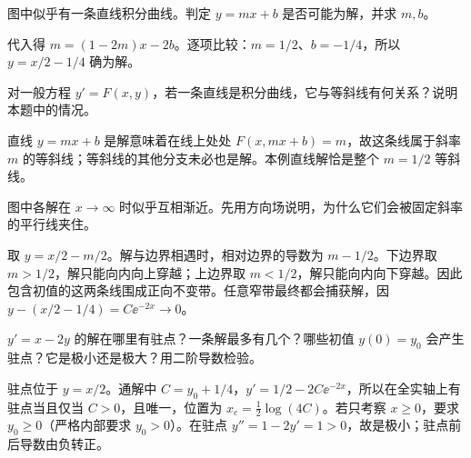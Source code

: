 \begin{exercise}\label{cw:rec02-2}
图中似乎有一条直线积分曲线。判定 $y=mx+b$ 是否可能为解，并求 $m,b$。
\end{exercise}
\begin{solution}
代入得 $m=(1-2m)x-2b$。逐项比较：$m=1/2$、$b=-1/4$，所以 $y=x/2-1/4$ 确为解。
\par{}
\end{solution}

\begin{exercise}\label{cw:rec02-3}
对一般方程 $y'=F(x,y)$，若一条直线是积分曲线，它与等斜线有何关系？说明本题中的情况。
\end{exercise}
\begin{solution}
直线 $y=mx+b$ 是解意味着在线上处处 $F(x,mx+b)=m$，故这条线属于斜率 $m$ 的等斜线；等斜线的其他分支未必也是解。本例直线解恰是整个 $m=1/2$ 等斜线。
\par{}
\end{solution}

\begin{exercise}\label{cw:rec02-4}
图中各解在 $x\to\infty$ 时似乎互相渐近。先用方向场说明，为什么它们会被固定斜率的平行线夹住。
\end{exercise}
\begin{solution}
取 $y=x/2-m/2$。解与边界相遇时，相对边界的导数为 $m-1/2$。下边界取 $m>1/2$，解只能向内向上穿越；上边界取 $m<1/2$，解只能向内向下穿越。因此包含初值的这两条线围成正向不变带。任意窄带最终都会捕获解，因 $y-(x/2-1/4)=C\ee^{-2x}\to0$。
\par{}
\end{solution}

\begin{exercise}\label{cw:rec02-5}
$y'=x-2y$ 的解在哪里有驻点？一条解最多有几个？哪些初值 $y(0)=y_0$ 会产生驻点？它是极小还是极大？用二阶导数检验。
\end{exercise}
\begin{solution}
驻点位于 $y=x/2$。通解中 $C=y_0+1/4$，$y'=1/2-2C\ee^{-2x}$，所以在全实轴上有驻点当且仅当 $C>0$，且唯一，位置为 $x_c=\frac12\log(4C)$。若只考察 $x\ge0$，要求 $y_0\ge0$（严格内部要求 $y_0>0$）。在驻点 $y''=1-2y'=1>0$，故是极小；驻点前后导数由负转正。
\par{}
\end{solution}

